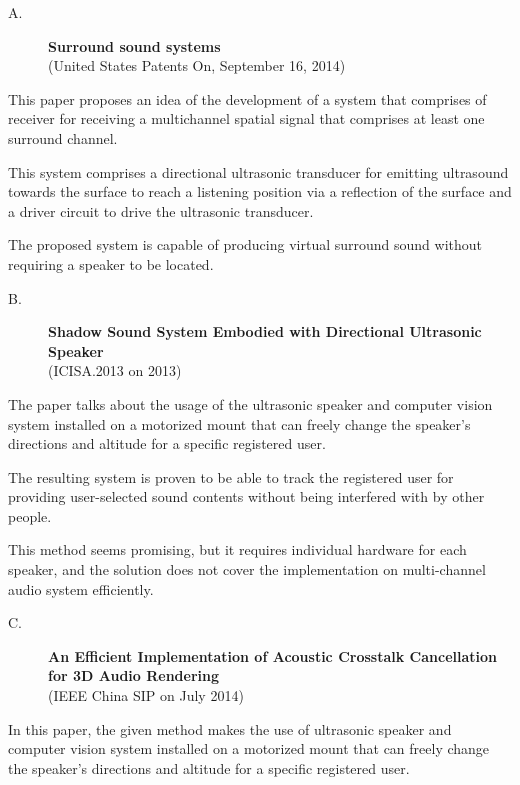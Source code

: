 \documentclass[../../../patent_v1.tex]{subfiles}
\begin{document}
    
\begin{description}
    \item[A.]\textbf{Surround sound systems}\\(United States Patents On, September 16, 2014)
\end{description}

This paper proposes an idea of the development of a system that comprises of receiver 
for receiving a multichannel spatial signal that comprises at least one surround channel.

This system comprises a directional ultrasonic transducer for emitting ultrasound 
towards the surface to reach a listening position via a reflection of the surface and a 
driver circuit to drive the ultrasonic transducer.

The proposed system is capable of producing virtual surround sound without requiring a 
speaker to be located.

\begin{description}
    \item[B.]\textbf{Shadow Sound System Embodied with Directional Ultrasonic Speaker}\\(ICISA.2013 on 2013) 
\end{description}

The paper talks about the usage of the ultrasonic speaker and computer vision system 
installed on a motorized mount that can freely change the speaker’s directions and 
altitude for a specific registered user.

The resulting system is proven to be able to track the registered 
user for providing user-selected sound contents without being 
interfered with by other people.

This method seems promising, but it requires individual hardware 
for each speaker, and the solution does not cover the implementation 
on multi-channel audio system efficiently.

\begin{description}
    \item[C.]\textbf{An Efficient Implementation of Acoustic Crosstalk Cancellation for 3D Audio Rendering}\\(IEEE China SIP on July 2014)    
\end{description}

In this paper, the given method makes the use of ultrasonic speaker and computer 
vision system installed on a motorized mount that can freely change 
the speaker’s directions and altitude for a specific registered user.
\end{document}
